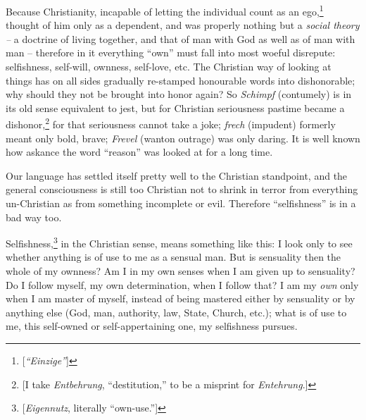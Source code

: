 \documentclass[12pt,a4paper]{book}
\begin{document}
Because Christianity, incapable of letting the individual count as an 
ego,\footnote{[\textit{``Einzige''}]} thought of him only as a dependent, 
and was properly nothing but a \textit{social theory --} a doctrine of living 
together, and that of man with God as well as of man with man -- therefore in 
it everything ``own'' must fall into most woeful disrepute: selfishness, 
self-will, ownness, self-love, etc. The Christian way of looking at things has 
on all sides gradually re-stamped honourable words into dishonorable; why 
should they not be brought into honor again? So \textit{Schimpf} (contumely) 
is in its old sense equivalent to jest, but for Christian seriousness pastime 
became a dishonor,\footnote{[I take \textit{Entbehrung}, ``destitution,'' to 
be a misprint for \textit{Entehrung}.]} for that seriousness cannot take a 
joke; \textit{frech} (impudent) formerly meant only bold, brave; 
\textit{Frevel} (wanton outrage) was only daring. It is well known how askance 
the word ``reason'' was looked at for a long time.

Our language has settled itself pretty well to the Christian standpoint, and 
the general consciousness is still too Christian not to shrink in terror from 
everything un-Christian as from something incomplete or evil. Therefore 
``selfishness'' is in a bad way too.

Selfishness,\footnote{[\textit{Eigennutz}, literally ``own-use.'']} in the 
Christian sense, means something like this: I look only to see whether 
anything is of use to me as a sensual man. But is sensuality then the whole of 
my ownness? Am I in my own senses when I am given up to sensuality? Do I 
follow myself, my own determination, when I follow that? I am my \textit{own} 
only when I am master of myself, instead of being mastered either by 
sensuality or by anything else (God, man, authority, law, State, Church, 
etc.); what is of use to me, this self-owned or self-appertaining one, my 
selfishness pursues.
\end{document}
